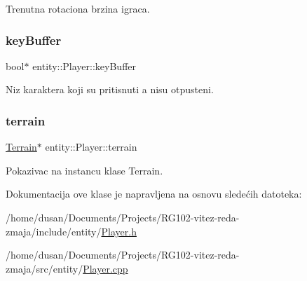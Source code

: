Trenutna rotaciona brzina igraca. 

\mbox{\label{classentity_1_1Player_ad36623cb0c52ae4dc97d73cbf1cd2134}} 
\subsubsection{\texorpdfstring{key\+Buffer}{keyBuffer}}
{\footnotesize\ttfamily bool$\ast$ entity\+::\+Player\+::key\+Buffer\hspace{0.3cm}{\ttfamily [private]}}



Niz karaktera koji su pritisnuti a nisu otpusteni. 

\mbox{\label{classentity_1_1Player_adc298ca7a3d8ab3528440489ed4ea60e}} 
\subsubsection{\texorpdfstring{terrain}{terrain}}
{\footnotesize\ttfamily \hyperlink{classterrain_1_1Terrain}{Terrain}$\ast$ entity\+::\+Player\+::terrain\hspace{0.3cm}{\ttfamily [private]}}



Pokazivac na instancu klase Terrain. 



Dokumentacija ove klase je napravljena na osnovu sledećih datoteka\+:\begin{DoxyCompactItemize}
\item 
/home/dusan/\+Documents/\+Projects/\+R\+G102-\/vitez-\/reda-\/zmaja/include/entity/\hyperlink{Player_8h}{Player.\+h}\item 
/home/dusan/\+Documents/\+Projects/\+R\+G102-\/vitez-\/reda-\/zmaja/src/entity/\hyperlink{Player_8cpp}{Player.\+cpp}\end{DoxyCompactItemize}

